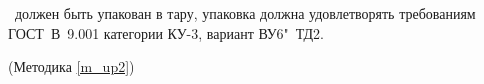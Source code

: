 \dut \ должен быть упакован в тару, упаковка должна удовлетворять требованиям ГОСТ~В~9.001 категории КУ-3, вариант ВУ6"~ТД2.


\begin{flushright}
	(Методика \ref{m_up2})
\end{flushright}